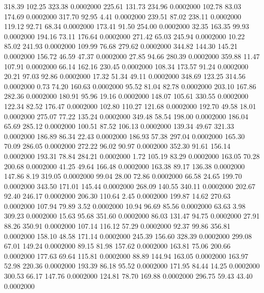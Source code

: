  318.39  102.25  323.38   0.0002000
 225.61  131.73  234.96   0.0002000
 102.78   83.03  174.69   0.0002000
 317.70   92.95    4.41   0.0002000
 239.51   87.02  238.11   0.0002000
 119.12   92.71   68.34   0.0002000
 173.41   91.50  254.00   0.0002000
  32.35  163.35   99.93   0.0002000
 194.16   73.11  176.64   0.0002000
 271.42   65.03  245.94   0.0002000
  10.22   85.02  241.93   0.0002000
 109.99   76.68  279.62   0.0002000
 344.82  144.30  145.21   0.0002000
 156.72   46.59   47.37   0.0002000
  27.85   94.66  280.39   0.0002000
 359.88   11.47  107.91   0.0002000
  66.14  162.16  230.45   0.0002000
 108.34  173.57   91.24   0.0002000
  20.21   97.03   92.86   0.0002000
  17.32   51.34   49.11   0.0002000
 348.69  123.25  314.56   0.0002000
   0.73   74.20  160.63   0.0002000
  95.52   81.04   82.78   0.0002000
 203.10  167.86  282.36   0.0002000
 180.91   95.96   19.16   0.0002000
 148.07  105.61  330.55   0.0002000
 122.34   82.52  176.47   0.0002000
 102.80  110.27  121.68   0.0002000
 192.70   49.58   18.01   0.0002000
 275.07   77.22  135.24   0.0002000
 349.48   58.54  198.00   0.0002000
 186.04   65.69  285.12   0.0002000
 100.51   87.52  106.13   0.0002000
 139.34   49.67  321.33   0.0002000
 186.89   86.34   22.43   0.0002000
 186.93   57.38  297.04   0.0002000
 165.30   70.09  286.05   0.0002000
 272.22   96.02   90.97   0.0002000
 352.30   91.61  156.14   0.0002000
 193.31   78.84  284.21   0.0002000
   1.72  105.19   83.29   0.0002000
 163.05   70.28  200.68   0.0002000
  41.25   49.64  166.48   0.0002000
 163.38   89.17  136.38   0.0002000
 147.86    8.19  319.05   0.0002000
  99.04   28.00   72.86   0.0002000
  66.58   24.65  199.70   0.0002000
 343.50  171.01  145.44   0.0002000
 268.09  140.55  340.11   0.0002000
 202.67   92.40  246.17   0.0002000
 206.30  110.64    2.45   0.0002000
 199.87   14.62  270.63   0.0002000
 107.94   79.89    3.52   0.0002000
  10.94   96.69   85.56   0.0002000
  63.63    3.98  309.23   0.0002000
  15.63   95.68  351.60   0.0002000
  86.03  131.47   94.75   0.0002000
  27.91   88.26  350.91   0.0002000
 107.14  116.12   57.29   0.0002000
  92.37   99.86  356.81   0.0002000
 158.10   48.58  171.14   0.0002000
 245.39  156.60  328.39   0.0002000
 299.08   67.01  149.24   0.0002000
  89.15   81.98  157.62   0.0002000
 163.81   75.06  200.66   0.0002000
 177.63   69.64  115.81   0.0002000
  88.89  144.94  163.05   0.0002000
 163.97   52.98  220.36   0.0002000
 193.39   86.18   95.52   0.0002000
 171.95   84.44   14.25   0.0002000
 300.53   66.17  147.76   0.0002000
 124.81   78.70  169.88   0.0002000
 296.75   59.43   43.40   0.0002000
